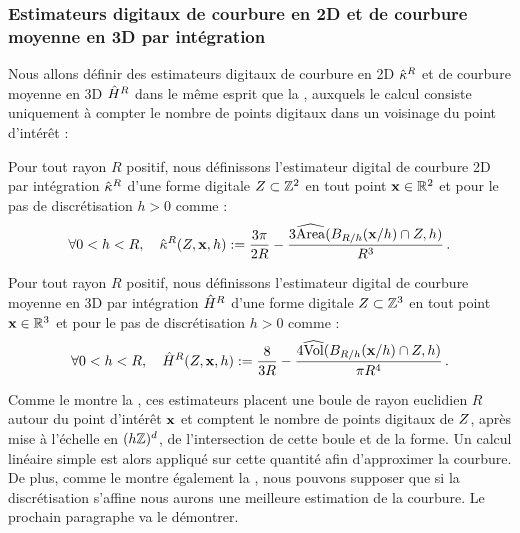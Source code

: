 \subsubsection{Estimateurs digitaux de courbure en 2D et de courbure moyenne en 3D par intégration}
%
Nous allons définir des estimateurs digitaux de courbure en 2D $\hat{\kappa}^{R}$ et de
courbure moyenne en 3D $\hat{H}^{R}$ dans le même esprit que la
, auxquels le calcul consiste uniquement à
compter le nombre de points digitaux dans un voisinage du point d'intérêt :
%
\begin{definition}{}\label{def:digital-2d-curvature}
  Pour tout rayon $R$ positif, nous définissons l'estimateur digital de courbure
  2D par intégration $\hat{\kappa}^{R}$ d'une forme digitale $Z \subset \mathbb{Z}^2$
  en tout point $\mathbf{x} \in \mathbb{R}^2$ et pour le pas de discrétisation $h > 0$ comme :
  \begin{equation}
    \forall 0 < h < R,\quad \hat{\kappa}^{R}(Z,\mathbf{x},h) := \frac{3\pi}{2R} - \frac{3\widehat{\mathrm{Area}}(B_{R/h}(\mathbf{x}/h) \cap Z, h)}{R^3}\,.
  \end{equation}
\end{definition}
%
\begin{definition}{}\label{def:digital-3d-mean-curvature}
  Pour tout rayon $R$ positif, nous définissons l'estimateur digital de courbure
  moyenne en 3D par intégration $\hat{H}^{R}$ d'une forme digitale $Z
  \subset \mathbb{Z}^3$ en tout point $\mathbf{x} \in \mathbb{R}^3$ et pour le pas de discrétisation $h >
  0$ comme :
  \begin{equation}
    \forall 0 < h < R,\quad \hat{H}^{R}(Z,\mathbf{x},h) := \frac{8}{3R} - \frac{4\widehat{\mathrm{Vol}}(B_{R/h}(\mathbf{x}/h) \cap Z, h)}{\pi R^4}\,.
  \end{equation}
\end{definition}
%
Comme le montre la , ces estimateurs placent
une boule de rayon euclidien $R$ autour du point d'intérêt $\mathbf{x}$ et comptent le
nombre de points digitaux de $Z$, après mise à l'échelle en $(h\mathbb{Z})^d$,
de l'intersection de cette boule et de la forme. Un calcul linéaire simple est
alors appliqué sur cette quantité afin d'approximer la courbure. De plus, comme
le montre également la , nous pouvons supposer
que si la discrétisation s'affine nous aurons une meilleure estimation de la
courbure. Le prochain paragraphe va le démontrer.
%
